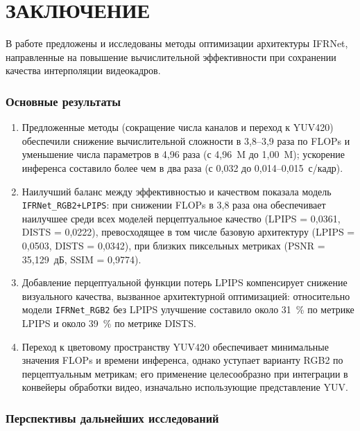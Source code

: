 \chapter*{ЗАКЛЮЧЕНИЕ}

В работе предложены и исследованы методы оптимизации архитектуры IFRNet, направленные на повышение вычислительной эффективности при сохранении качества интерполяции видеокадров.

\subsection*{Основные результаты}

\begin{enumerate}
	\item Предложенные методы (сокращение числа каналов и переход к YUV420) обеспечили снижение вычислительной сложности в 3,8--3,9 раза по FLOPs и уменьшение числа параметров в 4,96 раза (с 4,96~M до 1,00~M); ускорение инференса составило более чем в два раза (с 0,032 до 0,014--0,015~с/кадр).

	\item Наилучший баланс между эффективностью и качеством показала модель \texttt{IFRNet\_RGB2+LPIPS}: при снижении FLOPs в 3,8 раза она обеспечивает наилучшее среди всех моделей перцептуальное качество (LPIPS = 0,0361, DISTS = 0,0222), превосходящее в том числе базовую архитектуру (LPIPS = 0,0503, DISTS = 0,0342), при близких пиксельных метриках (PSNR = 35,129~дБ, SSIM = 0,9774).

	\item Добавление перцептуальной функции потерь LPIPS компенсирует снижение визуального качества, вызванное архитектурной оптимизацией: относительно модели \texttt{IFRNet\_RGB2} без LPIPS улучшение составило около 31~\% по метрике LPIPS и около 39~\% по метрике DISTS.

	\item Переход к цветовому пространству YUV420 обеспечивает минимальные значения FLOPs и времени инференса, однако уступает варианту RGB2 по перцептуальным метрикам; его применение целесообразно при интеграции в конвейеры обработки видео, изначально использующие представление YUV.
\end{enumerate}

\subsection*{Перспективы дальнейших исследований}

